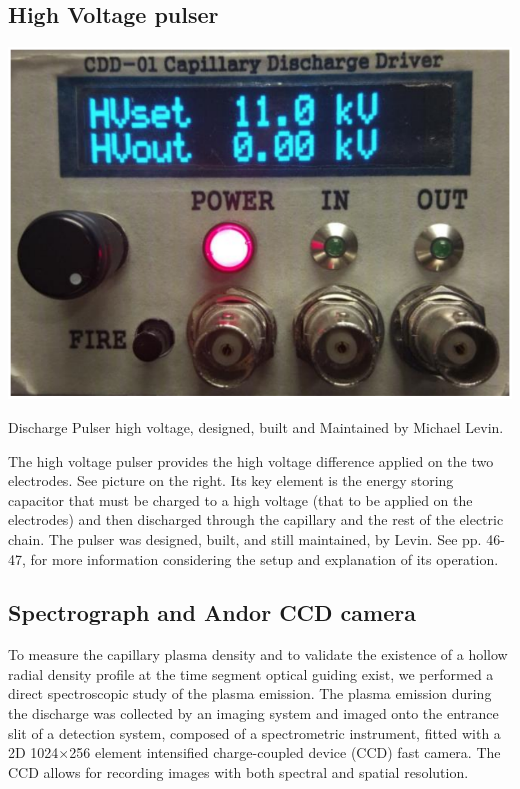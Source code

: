 \documentclass[justified,nofonts,nobib]{tufte-book}
\begin{document}
\subsection{High Voltage pulser}
\begin{marginfigure}
        \includegraphics[width=\marginparwidth]{figures/hvpulser.PNG}
        \caption{Discharge Pulser high voltage, designed, built and Maintained by Michael Levin.}
\end{marginfigure}
The high voltage pulser provides the high voltage difference applied on the two electrodes. See picture on the right. Its key element is the energy storing capacitor that must be charged to a high voltage (that to be applied on the electrodes) and then discharged through the capillary and the rest of the electric chain. The pulser was designed, built, and still maintained, by Levin. See  \cite{Levin2009ExcitationAcceleration} pp. 46-47, for more information considering the setup and explanation of its operation.
	
\subsection{Spectrograph and Andor CCD camera}\label{ssec:spectro}
To measure the capillary plasma density and to validate the existence of a hollow radial density profile at the time segment optical guiding exist, we performed a direct spectroscopic study of the plasma emission. The plasma emission during the discharge was collected by an imaging system and imaged onto the entrance slit of a detection system, composed of a spectrometric instrument, fitted with a 2D 1024$\times$256 element intensified charge-coupled device (CCD) fast camera. The CCD allows for recording images with both spectral and spatial resolution.
\end{document}
